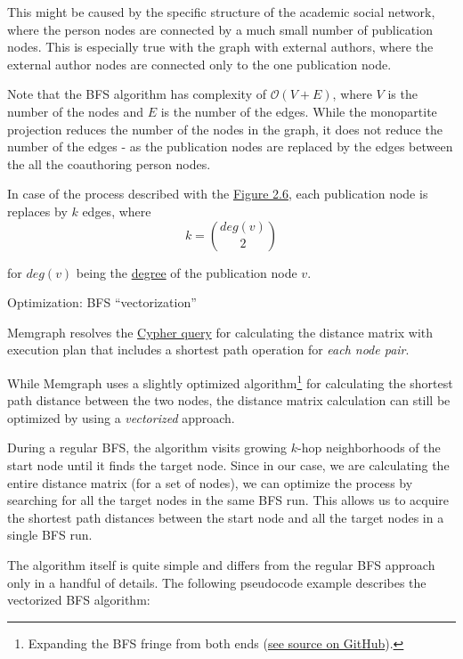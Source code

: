 This might be caused by the specific structure of the academic social network, where the person nodes are connected by a much small number of publication nodes.
This is especially true with the graph with external authors, where the external author nodes are connected only to the one publication node.

Note that the BFS algorithm has complexity of $\mathcal{O}(V + E)$, where $V$ is the number of the nodes and $E$ is the number of the edges.
While the monopartite projection reduces the number of the nodes in the graph, it does not reduce the number of the edges - as the publication nodes are replaced 
by the edges between the all the coauthoring person nodes. 

In case of the process described with the \hyperref[fig:monopartite-projection]{Figure 2.6}, each publication node is replaces 
by $k$ edges, where 
$$
k = \binom{deg(v)}{2}
$$

for $deg(v)$ being the \hyperref[def:node-degree]{degree} of the publication node $v$.

\begin{mybox}
    {Optimization: BFS ``vectorization''}

    Memgraph resolves the \hyperref[fig:distance-matrix-calculation]{Cypher query} for calculating the distance matrix
    with execution plan that includes a shortest path operation for \textit{each node pair}.

    While Memgraph uses a slightly optimized algorithm\footnote{Expanding the BFS fringe from both ends (\href{https://github.com/memgraph/memgraph/blob/58c3902c194e80a027d141788bd1afd07def0114/src/query/plan/operator.cpp\#L1569-L1572}{see source on GitHub}).} for calculating the shortest path distance between the two nodes,    
    the distance matrix calculation can still be optimized by using a \textit{vectorized} approach.

    During a regular BFS, the algorithm visits growing $k$-hop neighborhoods of the start node until it finds the target node.
    Since in our case, we are calculating the entire distance matrix (for a set of nodes), 
    we can optimize the process by searching for all the target nodes in the same BFS run.
    This allows us to acquire the shortest path distances between the start node and all 
    the target nodes in a single BFS run.

\end{mybox}

The algorithm itself is quite simple and differs from the regular BFS approach only in a handful of details.
The following pseudocode example describes the vectorized BFS algorithm:


